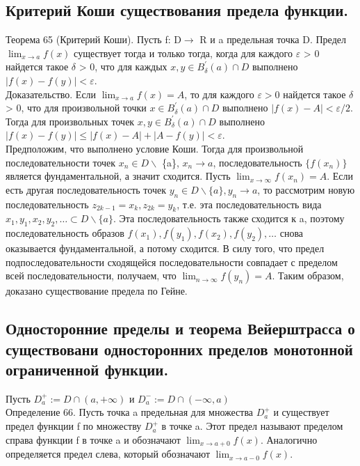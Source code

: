 \documentclass[12pt]{article}
\theoremstyle{definition}
\begin{document}
\smallskip
\subsection{Критерий Коши существования предела функции.}
Теорема 65 (Критерий Коши). Пусть f: D$\to$ R и a предельная точка D. Предел $\lim_{x \to a} f(x)$ существует тогда и только тогда, когда для каждого $\varepsilon$ > 0 найдется такое $\delta$ > 0, что для каждых $x, y \in B^{'}_{\delta} (a) \cap D$  выполнено $|f(x) - f(y)| < \varepsilon$. \\
Доказательство. Если $\lim_{x \to a} f(x) = A$, то для каждого $\varepsilon > 0$ найдется такое $\delta$ > 0, что для произвольной точки $x \in B^{'}_{\delta} (a) \cap D$  выполнено $|f(x) - A| < \varepsilon / 2$. Тогда для произвольных точек $x, y \in B^{'}_{\delta} (a) \cap D$ выполнено $|f(x) - f(y)| \leq |f(x) - A| + |A - f(y)| < \varepsilon$. \\

Предположим, что выполнено условие Коши. Тогда для произвольной последовательности точек $x_n \in D \backslash$ \{a\}, $x_n \to a$, последовательность $\{f(x_n)\}$ является фундаментальной, а значит сходится. Пусть $\lim_{x \to \infty} f(x_n) = A$. Если есть другая последовательность точек $y_n \in D \backslash \{a\}, y_n \to a$, то рассмотрим новую последовательность $z_{2k-1} = x_k, z_{2k} = y_k$, т.е. эта последовательность вида $x_1, y_1, x_2, y_2, \dots \subset D \backslash \{a\}$. Эта последовательность также сходится к a, поэтому последовательность образов $f(x_1), f(y_1), f(x_2), f(y_2), \dots$ снова оказывается фундаментальной, а потому сходится. В силу того, что предел подпоследовательности сходящейся последовательности совпадает с пределом всей последовательности, получаем, что $\lim_{n \to \infty} f(y_n) = A$. Таким образом, доказано существование предела по Гейне.
\smallskip 
\subsection{Односторонние пределы и теорема Вейерштрасса о существовани односторонних пределов монотонной ограниченной функции.} 
Пусть $D^{+}_{a} := D \cap (a, +\infty)$ и $D^{-}_{a} := D \cap (-\infty, a)$\\
Определение 66. Пусть точка a предельная для множества $D^{+}_{a}$ и существует предел функции f по множеству $D^{+}_{a}$ в точке a. Этот предел называют пределом справа функции f в точке a и обозначают $\lim_{x \to a+0} f(x)$. Аналогично определяется предел слева, который обозначают $\lim_{x \to a-0} f(x)$. \\
\end{document}
